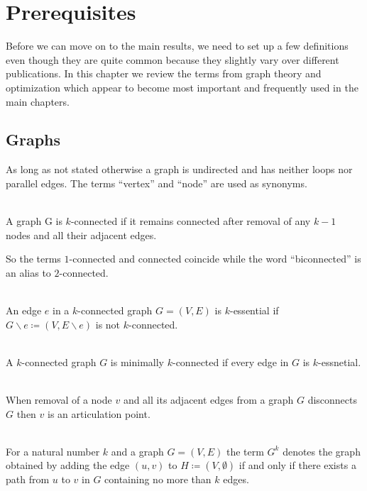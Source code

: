\chapter{Prerequisites}
Before we can move on to the main results, we need to set up a few definitions even though they are quite common because they slightly vary over different publications. In this chapter we review the terms from graph theory and optimization which appear to become most important and frequently used in the main chapters.

\section{Graphs}
As long as not stated otherwise a graph is undirected and has neither loops nor parallel edges. The terms \enquote{vertex} and \enquote{node} are used as synonyms.

\begin{definition} [\(k\)-connected]\label{def:k_connected}\ \\
  A graph G is \(k\)-connected if it remains connected after removal of any \(k-1\) nodes and all their adjacent edges.
\end{definition}

So the terms \(1\)-connected and connected coincide while the word \enquote{biconnected} is an alias to \(2\)-connected.

\begin{definition} [\(k\)-essential]\label{def:k_essential}\ \\
  An edge \(e\) in a \(k\)-connected graph \(G = (V, E)\) is \(k\)-essential if \(G \backslash e \coloneqq (V, E \backslash e)\) is not \(k\)-connected.
\end{definition}

\begin{definition}\label{def:min_k_connected}\ \\
  A \(k\)-connected graph \(G\) is minimally \(k\)-connected if every edge in \(G\) is \(k\)-essnetial.
\end{definition}

\begin{definition}\label{def:articulation_point}\ \\
  When removal of a node \(v\) and all its adjacent edges from a graph \(G\) disconnects \(G\) then \(v\) is an articulation point.
\end{definition}

\begin{definition}\label{def:power_of_graph}\ \\
  For a natural number \(k\) and a graph \(G = (V, E)\) the term \(G^{k}\) denotes the graph obtained by adding the edge \((u,v)\) to \(H \coloneqq (V, \emptyset)\) if and only if there exists a path from \(u\) to \(v\) in \(G\) containing no more than \(k\) edges.
\end{definition}

